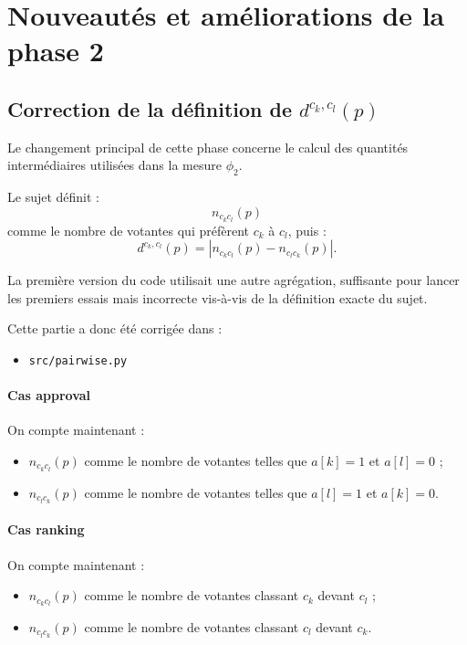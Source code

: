 \documentclass[11pt,a4paper]{article}
\begin{document}
\section{Nouveaut\'es et am\'eliorations de la phase 2}

\subsection{Correction de la d\'efinition de \texorpdfstring{$d^{c_k,c_l}(p)$}{d(k,l)}}

Le changement principal de cette phase concerne le calcul des quantit\'es interm\'ediaires utilis\'ees dans la mesure \(\phi_2\).

Le sujet d\'efinit :
\[
n_{c_kc_l}(p)
\]
comme le nombre de votantes qui pr\'ef\`erent \(c_k\) \`a \(c_l\), puis :
\[
d^{c_k,c_l}(p)=\left|n_{c_kc_l}(p)-n_{c_lc_k}(p)\right|.
\]

La premi\`ere version du code utilisait une autre agr\'egation, suffisante pour lancer les premiers essais mais incorrecte vis-\`a-vis de la d\'efinition exacte du sujet.

Cette partie a donc \'et\'e corrig\'ee dans :
\begin{itemize}[leftmargin=*]
    \item \texttt{src/pairwise.py}
\end{itemize}

\paragraph{Cas approval}
On compte maintenant :
\begin{itemize}[leftmargin=*]
    \item \(n_{c_kc_l}(p)\) comme le nombre de votantes telles que \(a[k]=1\) et \(a[l]=0\) ;
    \item \(n_{c_lc_k}(p)\) comme le nombre de votantes telles que \(a[l]=1\) et \(a[k]=0\).
\end{itemize}

\paragraph{Cas ranking}
On compte maintenant :
\begin{itemize}[leftmargin=*]
    \item \(n_{c_kc_l}(p)\) comme le nombre de votantes classant \(c_k\) devant \(c_l\) ;
    \item \(n_{c_lc_k}(p)\) comme le nombre de votantes classant \(c_l\) devant \(c_k\).
\end{itemize}
\end{document}
